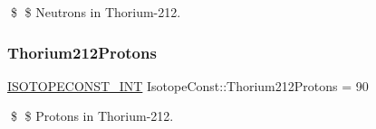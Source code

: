 \$ \$ Neutrons in Thorium-\/212. \mbox{\label{group___isotope_const-_thorium-_th212_gaf5abb69f60aaae4bb08090860c333322}} 
\subsubsection{\texorpdfstring{Thorium212\+Protons}{Thorium212Protons}}
{\footnotesize\ttfamily \mbox{\hyperlink{group___isotope_const-_macros_ga5f18360b3e99483a35c32d789e62621c}{I\+S\+O\+T\+O\+P\+E\+C\+O\+N\+S\+T\+\_\+\+I\+NT}} Isotope\+Const\+::\+Thorium212\+Protons = 90}

\$ \$ Protons in Thorium-\/212. 
